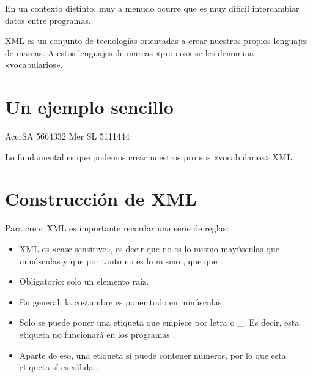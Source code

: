 \documentclass[letterpaper,10pt,spanish]{sphinxmanual}
\begin{document}
En un contexto distinto, muy a menudo ocurre que es muy difícil intercambiar datos entre programas.

XML es un conjunto de tecnologías orientadas a crear nuestros propios lenguajes de marcas. A estos lenguajes de marcas «propios» se les denomina «vocabularios».


\section{Un ejemplo sencillo}
\label{\detokenize{tema5:un-ejemplo-sencillo}}
\begin{sphinxVerbatim}[commandchars=\\\{\}]
                AcerSA
                5664332
                Mer SL
                5111444
\end{sphinxVerbatim}

Lo fundamental es que podemos crear nuestros propios «vocabularios» XML.


\section{Construcción de XML}
\label{\detokenize{tema5:construccion-de-xml}}
Para crear XML es importante recordar una serie de reglas:
\begin{itemize}
\item {} 
XML es «case-sensitive», es decir que no es lo mismo mayúsculas que minúsculas y que por tanto no es lo mismo , que  que .

\item {} 
Obligatorio: solo un elemento raíz.

\item {} 
En general, la costumbre es poner todo en minúsculas.

\item {} 
Solo se puede poner una etiqueta que empiece por letra o \_. Es decir, esta etiqueta no funcionará en los programas .

\item {} 
Aparte de eso, una etiqueta sí puede contener números, por lo que esta etiqueta sí es válida .

\end{itemize}
\end{document}
